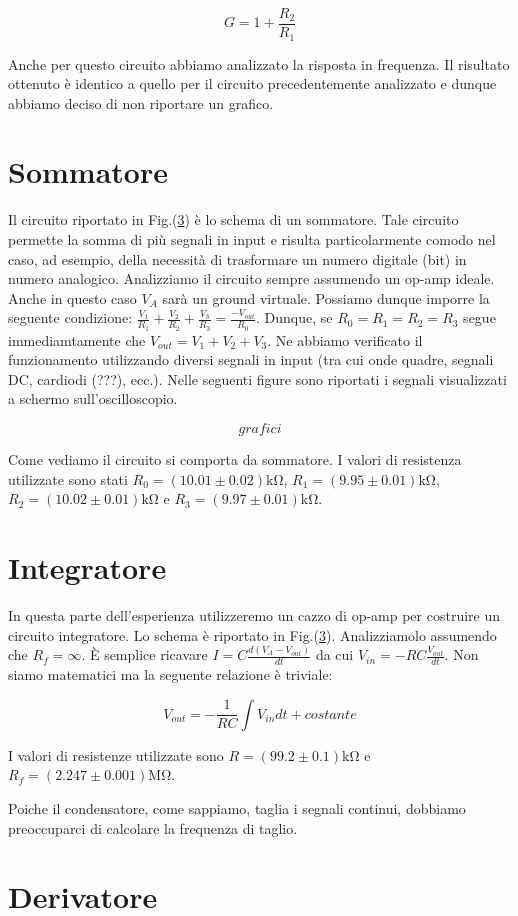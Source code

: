 $$G=1+\frac{R_2}{R_1}$$

Anche per questo circuito abbiamo analizzato la risposta in frequenza. Il risultato ottenuto è identico a quello per il circuito precedentemente analizzato e dunque abbiamo deciso di non riportare un grafico.



\section{Sommatore}

Il circuito riportato in Fig.(\ref{}) è lo schema di un sommatore. Tale circuito permette la somma di più segnali in input e risulta particolarmente comodo nel caso, ad esempio, della necessità di trasformare un numero digitale (bit) in numero analogico. Analizziamo il circuito sempre assumendo un op-amp ideale. Anche in questo caso $V_A$ sarà un ground virtuale. Possiamo dunque imporre la seguente condizione: $\frac{V_1}{R_1}+\frac{V_2}{R_2}+\frac{V_3}{R_3}=\frac{-V_{out}}{R_0}$. Dunque, se $R_0=R_1=R_2=R_3$ segue immediamtamente che $V_{out}=V_1+V_2+V_3$. Ne abbiamo verificato il funzionamento utilizzando diversi segnali in input (tra cui onde quadre, segnali DC, cardiodi (???), ecc.). Nelle seguenti figure sono riportati i segnali visualizzati a schermo sull'oscilloscopio.

$$grafici$$

Come vediamo il circuito si comporta da sommatore. I valori di resistenza utilizzate sono stati $R_0=(10.01\pm0.02)\si{\kilo\ohm}$, $R_1=(9.95\pm0.01)\si{\kilo\ohm}$, $R_2=(10.02\pm 0.01)\si{\kilo\ohm}$ e $R_3=(9.97\pm0.01)\si{\kilo\ohm}$.


\section{Integratore}

In questa parte dell'esperienza utilizzeremo un cazzo di op-amp per costruire un circuito integratore. Lo schema è riportato in Fig.(\ref{}). Analizziamolo assumendo che $R_f=\infty$. È semplice ricavare $I=C\frac{d(V_A-V_{out})}{dt}$ da cui $V_{in}=-RC\frac{V_{out}}{dt}$. Non siamo matematici ma la seguente relazione è triviale:

$$V_{out}=-\frac{1}{RC} \int V_{in}dt +costante$$

I valori di resistenze utilizzate sono $R=(99.2 \pm 0.1)\si{\kilo\ohm}$ e $R_f=(2.247 \pm 0.001)\si{\mega\ohm}$. 

Poiche il condensatore, come sappiamo, taglia i segnali continui, dobbiamo preoccuparci di calcolare la frequenza di taglio. 

\section{Derivatore}